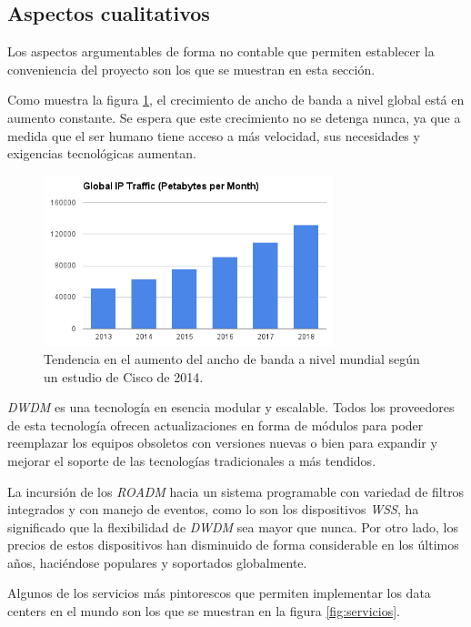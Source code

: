 \subsection{Aspectos cualitativos}
\label{sec:cualitativos}

Los aspectos argumentables de forma no contable que permiten
establecer la conveniencia del proyecto son los que se muestran en
esta sección.

Como muestra la figura \ref{fig:aumento_bw}, el crecimiento de ancho
de banda a nivel global está en aumento constante. Se espera que este
crecimiento no se detenga nunca, ya que a medida que el ser humano
tiene acceso a más velocidad, sus necesidades y exigencias tecnológicas
aumentan.

\begin{figure}[H]
  \centering
  \includegraphics[width=0.75\textwidth]{Imagenes/iptrafficchart.png}
  \caption{Tendencia en el aumento del ancho de banda a nivel mundial
    según un estudio de Cisco de 2014.\cite{ciscoiptraffic}}
  \label{fig:aumento_bw}
\end{figure}

\emph{DWDM} es una tecnología en esencia modular y escalable. Todos
los proveedores de esta tecnología ofrecen actualizaciones en forma de
módulos para poder reemplazar los equipos obsoletos con versiones
nuevas o bien para expandir y mejorar el soporte de las tecnologías
tradicionales a más tendidos.

La incursión de los \emph{ROADM} hacia un sistema programable con
variedad de filtros integrados y con manejo de eventos, como lo son
los dispositivos \emph{WSS}, ha significado que la flexibilidad de
\emph{DWDM} sea mayor que nunca. Por otro lado, los precios de estos
dispositivos han disminuido de forma considerable en los últimos años,
haciéndose populares y soportados globalmente.

Algunos de los servicios más pintorescos que permiten implementar los
data centers en el mundo son los que se muestran en la figura
\ref{fig:servicios}.

